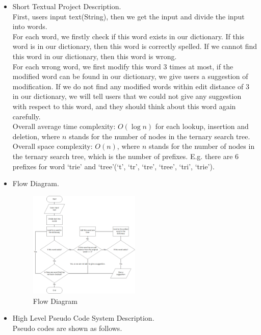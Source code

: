 

\begin{itemize} 
\item{  Short Textual Project Description. } \\
First, users input text(String), then we get the input and divide the input into words. \\
For each word, we firstly check if this word exists in our dictionary. If this word is in our dictionary, then this word is correctly spelled. If we cannot find this word in our dictionary, then this word is wrong. \\
For each wrong word, we first modify this word 3 times at most, if the modified word can be found in our dictionary, we give users a suggestion of modification. If we do not find any modified words within edit distance of 3 in our dictionary, we will tell users that we could not give any suggestion with respect to this word, and they should think about this word again carefully. \\
Overall average time complexity: $ O(\log n) $ for each lookup, insertion and deletion, where $ n $ stands for the number of nodes in the ternary search tree. \\
Overall space complexity: $ O(n) $, where $ n $ stands for the number of nodes in the ternary search tree, which is the number of prefixes. E.g. there are 6 prefixes for word `trie' and `tree'(`t', `tr', `tre', `tree', `tri', `trie').

\item{ Flow Diagram. }
\begin{figure}[H]
	\centering
	\includegraphics[width=0.5\textwidth]{fig/flow-diagram.png}
	\caption{Flow Diagram}
	\label{fig:flow-diagram}
\end{figure}
\item{ High Level Pseudo Code System Description. } \\
Pseudo codes are shown as follows.


\end{itemize}
